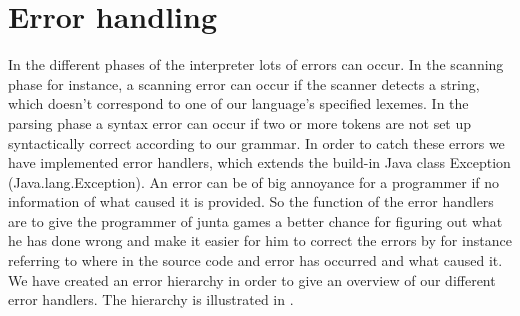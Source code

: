 \section{Error handling}

In the different phases of the interpreter lots of errors can occur. In the scanning phase for instance,
a scanning error can occur if the scanner detects a string, which doesn't correspond to one of our language's specified lexemes. In the parsing phase a syntax error can occur if two or more tokens are not set up syntactically correct according to our grammar. In order to catch these errors we have implemented error handlers, which extends the build-in Java class Exception (Java.lang.Exception). An error can be of big annoyance for a programmer if no information of what caused it is provided. So the function of the error handlers are to give the programmer of junta games a better chance for figuring out what he has done wrong and make it easier for him to correct the errors by for instance referring to where in the source code and error has occurred and what caused it. We have created an error hierarchy in order to give an overview of our different error handlers. The hierarchy is illustrated in . 


\begin{figure}[ht]
	\begin{center}
	\end{center}
	\label{ast:errorhierarchy}
\end{figure}

